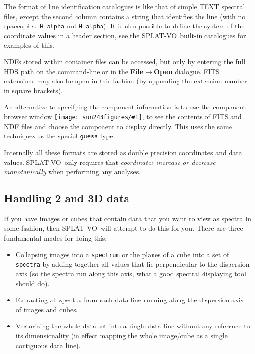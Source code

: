 \documentclass[twoside,11pt]{article}
\newcommand{\htmladdimg}[1]{}
\newcommand{\latexhtml}[2]{#1}
\renewcommand{\_}{\texttt{\symbol{95}}}
\newcommand{\SPLAT}{\textsf{SPLAT-VO}}
\newcommand{\inline}[1]
        {\latexhtml{\texttt{[image: sun243\_figures/\#1]}}
        {\htmladdimg[align=center]{#1.gif}}}
\newcommand{\submenuitem}[2]{\latexhtml{\textbf{#1$\rightarrow$#2}}{\textbf{#1->#2}}}
\newcommand{\hitext}[1]{\texttt{#1}}
\newcommand{\ie}{\textit{i.e.}}
\begin{document}
The format of line identification catalogues is like that of simple TEXT
spectral files, except the second column contains a string that identifies the
line (with no spaces, \ie\ \hitext{H-alpha} not \hitext{H alpha}). It is also
possible to define the system of the coordinate values in a header section,
see the \SPLAT\ built-in catalogues for examples of this.

NDFs stored within container files can be accessed, but only by entering the
full HDS path on the command-line or in the \submenuitem{File}{Open} dialogue.
FITS extensions may also be open in this fashion (by appending the extension
number in square brackets).

An alternative to specifying the component information is to use the component
browser window \inline{browse}, to see the contents of FITS and NDF files and
choose the component to display directly. This uses the same techniques as the
special \hitext{guess} type.

Internally all these formats are stored as double precision
coordinates and data values. \SPLAT\ only requires that
\textit{coordinates increase or decrease monotonically}
when performing any analyses.

\subsection{Handling 2 and 3D data}

If you have images or cubes that contain data that you want to view as spectra
in some fashion, then \SPLAT\ will attempt to do this for you. There are three
fundamental modes for doing this:
\begin{itemize}

\item Collapsing images into a \hitext{spectrum} or the planes of a cube into
a set of \hitext{spectra} by adding together all values that lie perpendicular
to the dispersion axis (so the spectra run along this axis, what a good
spectral displaying tool should do).

\item Extracting all spectra from each data line running along the
dispersion axis of images and cubes.

\item Vectorizing the whole data set into a single data line without any
reference to its dimensionality (in effect mapping the whole image/cube as a
single contiguous data line).

\end{itemize}
\end{document}
